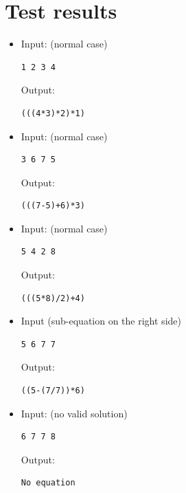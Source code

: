 \documentclass[a4paper,10pt]{article}
\begin{document}
\section{Test results}

\begin{itemize}

\item Input: (normal case)
\begin{lstlisting}[style = stdio]
1 2 3 4
\end{lstlisting}

  Output:
\begin{lstlisting}[style = stdio]
(((4*3)*2)*1)
\end{lstlisting}

\item Input: (normal case)
\begin{lstlisting}[style = stdio]
3 6 7 5
\end{lstlisting}

  Output:
\begin{lstlisting}[style = stdio]
(((7-5)+6)*3)
\end{lstlisting}

\item Input: (normal case)
\begin{lstlisting}[style = stdio]
5 4 2 8
\end{lstlisting}

  Output:
\begin{lstlisting}[style = stdio]
(((5*8)/2)+4)
\end{lstlisting}

\item Input (sub-equation on the right side)
\begin{lstlisting}[style = stdio]
5 6 7 7
\end{lstlisting}

  Output:
\begin{lstlisting}[style = stdio]
((5-(7/7))*6)
\end{lstlisting}

\item Input: (no valid solution)
\begin{lstlisting}[style = stdio]
6 7 7 8
\end{lstlisting}

  Output:
\begin{lstlisting}[style = stdio]
No equation
\end{lstlisting}


\end{itemize}
\end{document}
